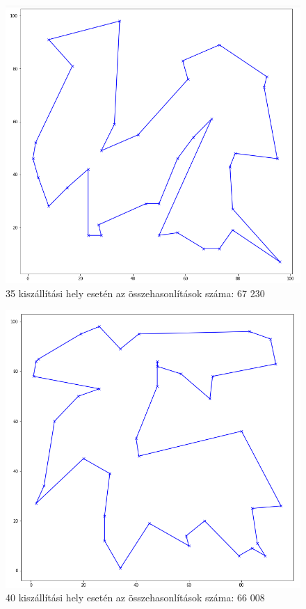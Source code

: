 \begin{figure}[h!]
\centering
\includegraphics[scale=0.4]{images/35.png}
\caption{35 kiszállítási hely esetén az összehasonlítások száma: 67 230}
\label{fig:tsp35location}
\end{figure}

\begin{figure}[h!]
\centering
\includegraphics[scale=0.4]{images/40.png}
\caption{40 kiszállítási hely esetén az összehasonlítások száma: 66 008}
\label{fig:tsp40location}
\end{figure}

